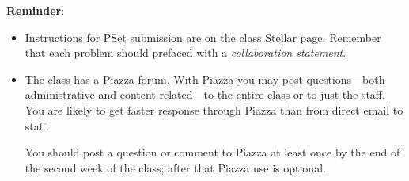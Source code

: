 \documentclass[handout]{mcs}
\begin{document}
\renewcommand{\reading}{
\begin{itemize}
\item Chapter~\bref{proofs_chap}{.\ \emph{What is a Proof?}}

\item Chapter~\bref{logicform_chap}{.\ \emph{Logical Formulas}}
  through~\bref{SAT_sec}

\end{itemize}
These assigned readings do \textbf{not}
  include the Problem sections.  (Many of the problems in the text
  will appear as class or homework problems.)}


\medskip

\textbf{Reminder}:

\begin{itemize}

\item
  \href{https://courses.csail.mit.edu/6.042/spring18/pset_instructions}
       {Instructions for PSet submission} are on the class
       \href{https://stellar.mit.edu/S/course/6/sp18/6.042/}{Stellar
         page}.  Remember that each problem should prefaced with a
       \href{http://courses.csail.mit.edu/6.042/spring18/pset_instructions.shtml#collab-state}
            {\emph{collaboration statement}}.

\item The class has a
  \href{https://piazza.com/mit/spring2018/6042/home} {Piazza
    forum}.  With Piazza you may post questions---both administrative
  and content related---to the entire class or to just the staff.  You
  are likely to get faster response through Piazza than from direct
  email to staff.

  You should post a question or comment to Piazza at least once by the
  end of the second week of the class; after that Piazza use is
  optional.
\end{itemize}





 

\end{document}
